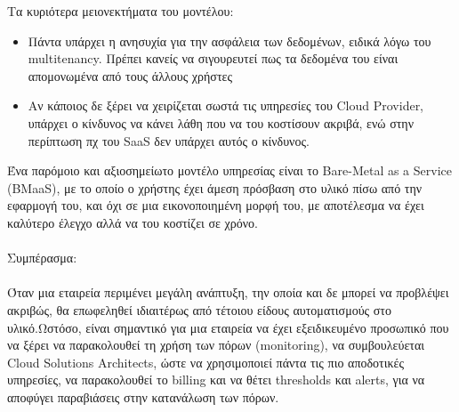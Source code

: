\documentclass{article}
\begin{document}
 Τα κυριότερα μειονεκτήματα του μοντέλου:
\begin{itemize}
\item Πάντα υπάρχει η ανησυχία για την ασφάλεια των δεδομένων, ειδικά λόγω του multitenancy. Πρέπει κανείς να σιγουρευτεί πως τα δεδομένα του είναι απομονωμένα από τους άλλους χρήστες
\item Αν κάποιος δε ξέρει να χειρίζεται σωστά τις υπηρεσίες του Cloud Provider, υπάρχει ο κίνδυνος να κάνει λάθη που να του κοστίσουν ακριβά, ενώ στην περίπτωση πχ του SaaS δεν υπάρχει αυτός ο κίνδυνος.
\end{itemize}
Ένα παρόμοιο και αξιοσημείωτο μοντέλο υπηρεσίας είναι το Bare-Metal as a Service (BMaaS), με το οποίο ο χρήστης έχει άμεση πρόσβαση στο υλικό πίσω από την εφαρμογή του, και όχι σε μια εικονοποιημένη μορφή του, με αποτέλεσμα να έχει καλύτερο έλεγχο αλλά να του κοστίζει σε χρόνο. \\ \\
Συμπέρασμα: \\ \\
Όταν μια εταιρεία περιμένει μεγάλη ανάπτυξη, την οποία και δε μπορεί να προβλέψει ακριβώς, θα επωφεληθεί ιδιαιτέρως από τέτοιου είδους αυτοματισμούς στο υλικό.Ωστόσο, είναι σημαντικό για μια εταιρεία να έχει εξειδικευμένο προσωπικό που να ξέρει να παρακολουθεί τη χρήση των πόρων (monitoring), να συμβουλεύεται Cloud Solutions Architects, ώστε να χρησιμοποιεί πάντα τις πιο αποδοτικές υπηρεσίες, να παρακολουθεί το billing και να θέτει thresholds και alerts, για να αποφύγει παραβιάσεις στην κατανάλωση των πόρων.
\end{document}

